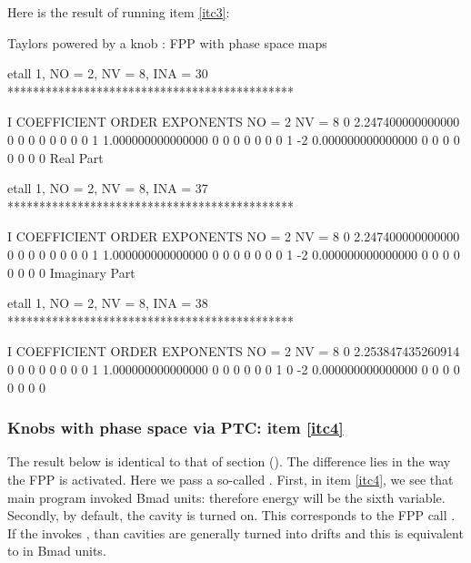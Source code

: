 \documentclass{hitec}     %
\begin{document}
{Here is the result of running item \ref{itc3}:

\renewcommand{\codefont}{\footnotesize}
\begin{code}
 Taylors powered by a knob : FPP with phase space maps

 etall    1, NO =    2, NV =    8, INA =   30
 *********************************************

    I  COEFFICIENT          ORDER   EXPONENTS
      NO =     2      NV =     8
   0   2.247400000000000       0  0  0  0  0  0  0  0
   1   1.000000000000000       0  0  0  0  0  0  0  1
    -2   0.000000000000000       0  0  0  0  0  0  0  0
  Real Part

 etall    1, NO =    2, NV =    8, INA =   37
 *********************************************

    I  COEFFICIENT          ORDER   EXPONENTS
      NO =     2      NV =     8
   0   2.247400000000000       0  0  0  0  0  0  0  0
   1   1.000000000000000       0  0  0  0  0  0  0  1
    -2   0.000000000000000       0  0  0  0  0  0  0  0
  Imaginary Part

 etall    1, NO =    2, NV =    8, INA =   38
 *********************************************

    I  COEFFICIENT          ORDER   EXPONENTS
      NO =     2      NV =     8
   0   2.253847435260914       0  0  0  0  0  0  0  0
   1   1.000000000000000       0  0  0  0  0  0  1  0
    -2   0.000000000000000       0  0  0  0  0  0  0  0
\end{code}
\renewcommand{\codefont}{\small}

 
\subsubsection{Knobs with phase space via PTC: item \ref{itc4}}
\label{s:initwithpsptc}

The result below is identical to that of section (). The difference lies in the way the FPP is activated. Here we pass a so-called .
First, in item \ref{itc4}, we see that main program invoked Bmad units: therefore energy will be the sixth variable. Secondly, by default, the cavity is turned on. This corresponds to the FPP call . If the  invokes , than cavities are generally turned into drifts and this is equivalent to  in Bmad units.

}
\end{document}
